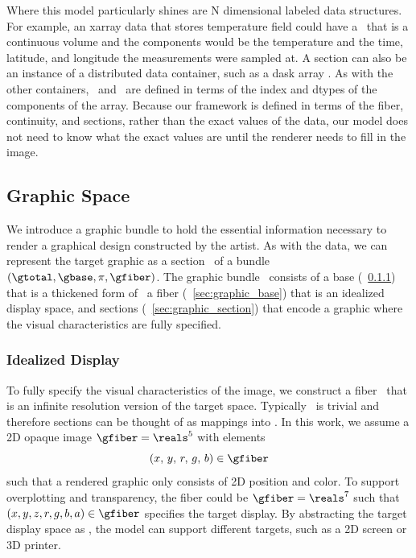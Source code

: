 \documentclass[../main.tex]{subfiles}
\begin{document}
Where this model particularly shines are N dimensional labeled data structures. For example, an xarray\cite{hoyer2017xarray} data that stores temperature field could have a \dbase\ that is a continuous volume and the components would be the temperature and the time, latitude, and longitude the measurements were sampled at. A section can also be an instance of a distributed data container, such as a dask array \cite{rocklinDaskParallelComputation2015}. As with the other containers, \dbase\ and \dfiber\ are defined in terms of the index and dtypes of the components of the array. Because our framework is defined in terms of the fiber, continuity, and sections, rather than the exact values of the data, our model does not need to know what the exact values are until the renderer needs to fill in the image.  


\subsection{Graphic Space \gtotal}
\label{sec:graphic}  
We introduce a graphic bundle to hold the essential information necessary to render a graphical design constructed by the artist. As with the data, we can represent the target graphic as a section \gsection\ of a bundle  $(\gtotal, \gbase, \pi, \gfiber)$. The graphic bundle \gtotal\ consists of a base \gbase (~\ref{sec:graphic_fiber}) that is a thickened form of \dbase\, 
a fiber \gfiber (~\ref{sec:graphic_base}) that is an idealized display space, and sections \gsection (~\ref{sec:graphic_section}) that encode a graphic where the visual characteristics are fully specified.

\subsubsection{Idealized Display \gfiber}
\label{sec:graphic_fiber}
To fully specify the visual characteristics of the image, we construct a fiber \gfiber\ that is an infinite resolution version of the target space. Typically \gtotal\ is trivial and therefore sections can be thought of as mappings into \gfiber. In this work, we assume a 2D opaque image $\gfiber=\reals^5$ with elements 
\begin{equation}
(x,\, y,\, r,\, g,\, b) \in \gfiber
\end{equation}
such that a rendered graphic only consists of 2D position and color. To support overplotting and transparency, the fiber could be $\gfiber=\reals^{7}$ such that $(x, y, z, r, g, b, a) \in \gfiber$ specifies the target display. By abstracting the target display space as \gfiber, the model can support different targets, such as a 2D screen or 3D printer. 
\end{document}
